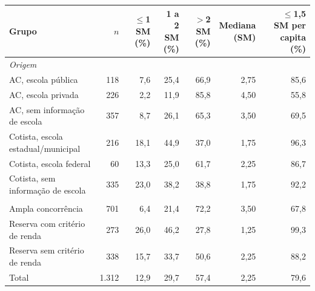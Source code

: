 \begin{tabular}{lrrrrrr}
\toprule
Grupo & $n$ & \makecell[r]{$\leq$1 SM\\(\%)} & \makecell[r]{1 a 2 SM\\(\%)} & \makecell[r]{$>$2 SM\\(\%)} & \makecell[r]{Mediana\\(SM)} & \makecell[r]{$\leq$1,5 SM per\\capita (\%)} \\
\midrule
\multicolumn{7}{l}{\textit{Origem}} \\
\quad AC, escola pública & 118 & 7,6 & 25,4 & 66,9 & 2,75 & 85,6 \\
\quad AC, escola privada & 226 & 2,2 & 11,9 & 85,8 & 4,50 & 55,8 \\
\quad AC, sem informação de escola & 357 & 8,7 & 26,1 & 65,3 & 3,50 & 69,5 \\
\quad Cotista, escola estadual/municipal & 216 & 18,1 & 44,9 & 37,0 & 1,75 & 96,3 \\
\quad Cotista, escola federal & 60 & 13,3 & 25,0 & 61,7 & 2,25 & 86,7 \\
\quad Cotista, sem informação de escola & 335 & 23,0 & 38,2 & 38,8 & 1,75 & 92,2 \\
\addlinespace
\multicolumn{7}{l}{\textit{Modalidade de ingresso}} \\
\quad Ampla concorrência & 701 & 6,4 & 21,4 & 72,2 & 3,50 & 67,8 \\
\quad Reserva com critério de renda & 273 & 26,0 & 46,2 & 27,8 & 1,25 & 99,3 \\
\quad Reserva sem critério de renda & 338 & 15,7 & 33,7 & 50,6 & 2,25 & 88,2 \\
\addlinespace
Total & 1.312 & 12,9 & 29,7 & 57,4 & 2,25 & 79,6 \\
\bottomrule
\end{tabular}
